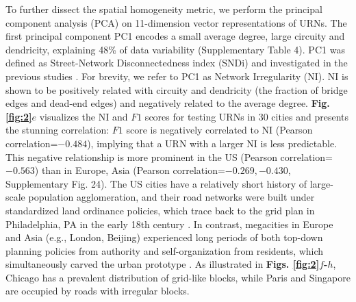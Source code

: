\documentclass[10pt]{wlscirep}
\begin{document}
To further dissect the spatial homogeneity metric, we perform the principal component analysis (PCA) on 11-dimension vector representations of URNs. The first principal component PC1 encodes a small average degree, large circuity and dendricity, explaining 48\% of data variability (Supplementary Table 4). PC1 was defined as Street-Network Disconnectedness index (SNDi) and investigated in the previous studies \cite{barrington2019global,barrington2020global}. For brevity, we refer to PC1 as Network Irregularity (NI). NI is shown to be positively related with circuity and dendricity (the fraction of bridge edges and dead-end edges) and negatively related to the average degree. \textbf{Fig. \ref{fig:2}$e$} visualizes the NI and $F1$ scores for testing URNs in 30 cities and presents the stunning correlation: $F1$ score is negatively correlated to NI (Pearson correlation=$-0.484$), implying that a URN with a larger NI is less predictable. This negative relationship is more prominent in the US (Pearson correlation=$-0.563$) than in Europe, Asia (Pearson correlation=$-0.269, -0.430$, Supplementary Fig. 24). The US cities have a relatively short history of large-scale population agglomeration, and their road networks were built under standardized land ordinance policies, which trace back to the grid plan in Philadelphia, PA in the early 18th century \cite{hammack1984philadelphia}. In contrast, megacities in Europe and Asia (e.g., London, Beijing) experienced long periods of both top-down planning policies from authority and self-organization from residents, which simultaneously carved the urban prototype \cite{barthelemy2013self}. As illustrated in \textbf{Figs. \ref{fig:2}$f$-$h$}, Chicago has a prevalent distribution of grid-like blocks, while Paris and Singapore are occupied by roads with irregular blocks. 
\end{document}
